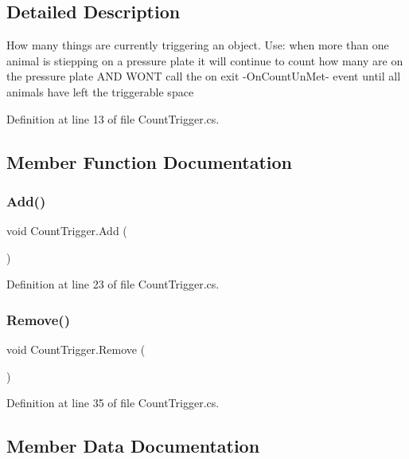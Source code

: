 \subsection{Detailed Description}
How many things are currently triggering an object. Use\+: when more than one animal is stiepping on a pressure plate it will continue to count how many are on the pressure plate A\+ND W\+O\+NT call the on exit -\/\+On\+Count\+Un\+Met-\/ event until all animals have left the triggerable space 



Definition at line 13 of file Count\+Trigger.\+cs.



\subsection{Member Function Documentation}
\mbox{\label{class_count_trigger_a7ac7751ad41acdb8eddf93f30ab25b73}} 
\subsubsection{\texorpdfstring{Add()}{Add()}}
{\footnotesize\ttfamily void Count\+Trigger.\+Add (\begin{DoxyParamCaption}{ }\end{DoxyParamCaption})}



Definition at line 23 of file Count\+Trigger.\+cs.

\mbox{\label{class_count_trigger_a2bf18805d9afcd8a686fbad7ddb86a3a}} 
\subsubsection{\texorpdfstring{Remove()}{Remove()}}
{\footnotesize\ttfamily void Count\+Trigger.\+Remove (\begin{DoxyParamCaption}{ }\end{DoxyParamCaption})}



Definition at line 35 of file Count\+Trigger.\+cs.



\subsection{Member Data Documentation}
\mbox{\label{class_count_trigger_ad0d5ce3d95e858b575ffc5252ac78c2d}} 
